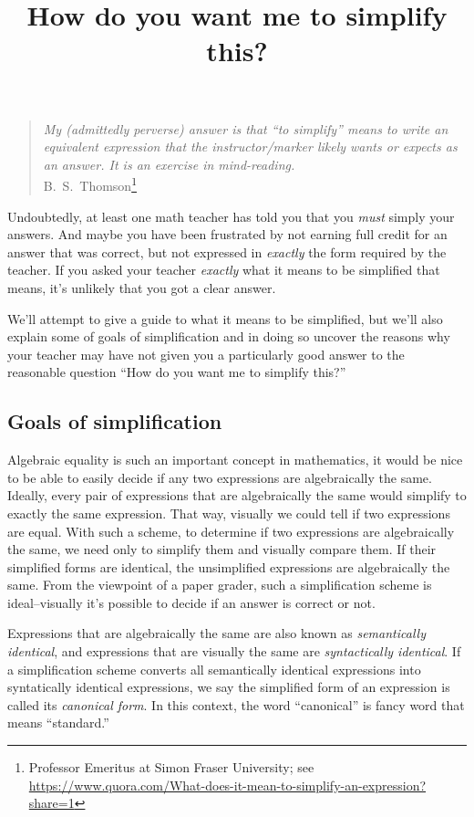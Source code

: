 \documentclass[12pt,fleqn]{article}
\title{How do you want me to simplify this?}
\begin{document}
\maketitle
\begin{quote}
\emph{My (admittedly perverse) answer is that ``to simplify''  means to write an equivalent expression that the instructor/marker likely wants or expects as an answer. It is an exercise in mind-reading.} \\  \phantom{xxxxx} \hfill   {\mbox{\sc B.\ S.\ Thomson}\footnote{\tiny Professor Emeritus at Simon Fraser University;  see  \url{https://www.quora.com/What-does-it-mean-to-simplify-an-expression?share=1}} }
\end{quote}


Undoubtedly, at least one math teacher has told you that you \emph{must} simply 
your answers. And maybe you have been frustrated by not earning full
credit for an answer that was correct, but not expressed in \emph{exactly}
the form required by the teacher. If you asked your teacher \emph{exactly} what it 
means to be simplified that means, it's unlikely that you got a clear 
answer. 

We'll attempt to give a guide to what it means to be simplified, but we'll
also explain some of goals of simplification and in doing so uncover
the reasons why your teacher may have not given you a particularly good
answer to the reasonable question ``How do you want me to simplify this?''

\subsection*{Goals of simplification}

Algebraic equality is such an important concept in mathematics, it would be nice to be able to easily decide if any two expressions are algebraically
the  same. Ideally, every pair of expressions that are algebraically the same would simplify to exactly the same expression. That way, visually we could
tell if two expressions are equal. With such a scheme, to determine if two expressions are algebraically the same, we need only to simplify them 
and visually compare them. If their simplified forms are identical, the unsimplified expressions are algebraically the same. From the viewpoint
of a paper grader, such a simplification scheme is ideal--visually it's possible to decide if an answer is correct or not.

Expressions that are algebraically the same are also known as \emph{semantically identical}, and expressions that are visually the same are \emph{syntactically identical}.  If a simplification scheme converts all semantically identical expressions into syntatically identical expressions,
we say the simplified form of an expression is called its \emph{canonical form}.  In this context, the word ``canonical'' is fancy word that means ``standard.''
\end{document}
